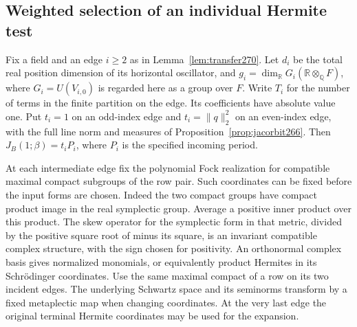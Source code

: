 \documentclass[a4paper,11pt]{article}
\theoremstyle{definition}
\theoremstyle{remark}
\numberwithin{equation}{section}
\begin{document}
\subsection{Weighted selection of an individual Hermite test}\label{nav:VIII-43}
Fix a field and an edge \(i\ge2\) as in
Lemma~\ref{lem:transfer270}. Let \(d_i\) be the total real
position dimension of its horizontal oscillator, and
\(g_i=\dim_{\mathbb R}G_i(\mathbb R\otimes_{\mathbb Q}F)\),
where \(G_i=U(V_{i,0})\) is regarded here as a group over
\(F\). Write \(T_i\) for the number of terms in the finite
partition on the edge. Its coefficients have absolute value
one. Put \(t_i=1\) on an odd-index edge and \(t_i=\|q\|_2^2\)
on an even-index edge, with the full line norm and measures
of Proposition~\ref{prop:jacorbit266}. Then \(J_B(1;\beta)=t_iP_i\),
where \(P_i\) is the specified incoming period.

At each intermediate edge fix the polynomial Fock realization
for compatible maximal compact subgroups of the row pair.
Such coordinates can be fixed before the input forms are chosen.
Indeed the two compact groups have compact product image in
the real symplectic group. Average a positive inner product over
this product. The skew operator for the symplectic form in that
metric, divided by the positive square root of minus its square,
is an invariant compatible complex structure, with the sign
chosen for positivity. An orthonormal complex basis gives
normalized monomials, or equivalently product Hermites in its
Schr\"odinger coordinates. Use the same maximal compact of a row
on its two incident edges. The underlying Schwartz space and its
seminorms transform by a fixed metaplectic map when changing
coordinates. At the very last edge the original terminal Hermite
coordinates may be used for the expansion.
\end{document}

